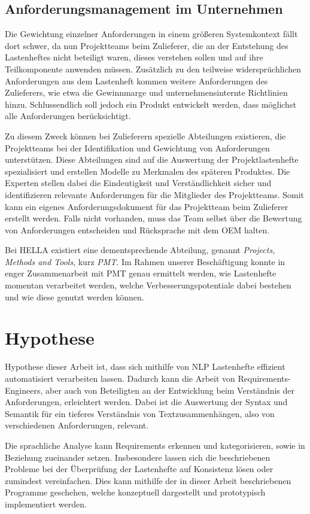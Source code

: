 \documentclass[12pt]{report}
\begin{document}
\subsection{Anforderungsmanagement im Unternehmen}
Die Gewichtung einzelner Anforderungen in einem größeren Systemkontext fällt dort schwer, da nun Projektteams beim Zulieferer, die an der Entstehung des Lastenheftes nicht beteiligt waren, dieses verstehen sollen und auf ihre Teilkomponente anwenden müssen. Zusätzlich zu den teilweise widersprüchlichen Anforderungen aus dem Lastenheft kommen weitere Anforderungen des Zulieferers, wie etwa die Gewinnmarge und unternehmensinternte Richtlinien hinzu. Schlussendlich soll jedoch ein Produkt entwickelt werden, dass möglichst alle Anforderungen berücksichtigt. \cite{mw02}

Zu diesem Zweck können bei Zulieferern spezielle Abteilungen existieren, die Projektteams bei der Identifikation und Gewichtung von Anforderungen unterstützen. Diese Abteilungen sind auf die Auswertung der Projektlastenhefte spezialisiert und erstellen Modelle zu Merkmalen des späteren Produktes. Die Experten stellen dabei die Eindeutigkeit und Verständlichkeit sicher und identifizieren relevante Anforderungen für die Mitglieder des Projektteams. Somit kann ein eigenes Anforderungsdokument für das Projektteam beim Zulieferer erstellt werden. 
Falls nicht vorhanden, muss das Team selbst über die Bewertung von Anforderungen entscheiden und Rücksprache mit dem OEM halten.

Bei HELLA existiert eine dementsprechende Abteilung, genannt \textit{Projects, Methods and Tools}, kurz \textit{PMT}. Im Rahmen unserer Beschäftigung konnte in enger Zusammenarbeit mit PMT genau ermittelt werden, wie Lastenhefte momentan verarbeitet werden, welche Verbesserungspotentiale dabei bestehen und wie diese genutzt werden können.

\section{Hypothese}
Hypothese dieser Arbeit ist, dass sich mithilfe von NLP Lastenhefte effizient automatisiert verarbeiten lassen. Dadurch kann die Arbeit von Requirements-Engineers, aber auch von Beteiligten an der Entwicklung beim Verständnis der Anforderungen, erleichtert werden. Dabei ist die Auswertung der Syntax und Semantik für ein tieferes Verständnis von Textzusammenhängen, also von verschiedenen Anforderungen, relevant.

Die sprachliche Analyse kann Requirements erkennen und kategorisieren, sowie in Beziehung zueinander setzen. Insbesondere lassen sich die beschriebenen Probleme bei der Überprüfung der Lastenhefte auf Konsistenz lösen oder zumindest vereinfachen. Dies kann mithilfe der in dieser Arbeit beschriebenen Programme geschehen, welche konzeptuell dargestellt und prototypisch implementiert werden. 
\end{document}
